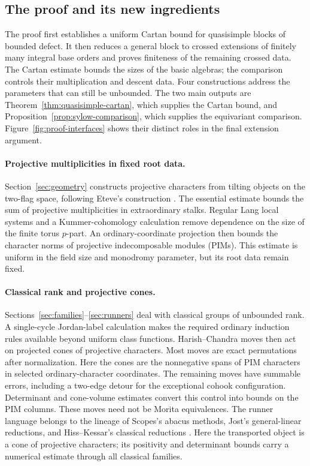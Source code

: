 \subsection{The proof and its new ingredients}

The proof first establishes a uniform Cartan bound for quasisimple
blocks of bounded defect.  It then reduces a general block to crossed
extensions of finitely many integral base orders and proves
finiteness of the remaining crossed data.  The Cartan estimate bounds the sizes of the basic algebras;
the comparison controls their multiplication and descent data.
Four constructions address the parameters that can still be unbounded.  The two main outputs
are Theorem~\ref{thm:quasisimple-cartan}, which supplies the Cartan
bound, and Proposition~\ref{prop:sylow-comparison}, which supplies
the equivariant comparison.  Figure~\ref{fig:proof-interfaces}
shows their distinct roles in the final extension argument.

\paragraph{Projective multiplicities in fixed root data.}
Section~\ref{sec:geometry} constructs projective characters from
tilting objects on the two-flag space, following Eteve's construction
\cite{Eteve}.  The essential estimate bounds
the sum of projective multiplicities in extraordinary stalks.
Regular Lang local systems and a Kummer-cohomology calculation remove
dependence on the size of the finite torus \(p\)-part.
An ordinary-coordinate projection then bounds the character norms
of projective indecomposable modules (PIMs).
This estimate is uniform in the field size and monodromy parameter,
but its root data remain fixed.

\paragraph{Classical rank and projective cones.}
Sections~\ref{sec:families}--\ref{sec:runners} deal with classical
groups of unbounded rank.  A single-cycle Jordan-label calculation
makes the required ordinary induction rules available beyond uniform
class functions.  Harish--Chandra moves then act on projected cones
of projective characters.  Most moves are exact permutations after
normalization.  Here the cones are the nonnegative spans of PIM
characters in selected ordinary-character coordinates.
The remaining moves have summable errors, including
a two-edge detour for the exceptional cohook configuration.
Determinant and cone-volume estimates convert this control into
bounds on the PIM columns.  These moves need not be Morita
equivalences.  The runner language belongs to the lineage of
Scopes's abacus methods, Jost's general-linear reductions, and
Hiss--Kessar's classical reductions
\cite{Scopes,Jost,HissKessarScopes,HissKessarScopesII}.
Here the transported object is a cone
of projective characters; its positivity and determinant bounds
carry a numerical estimate through all classical families.

